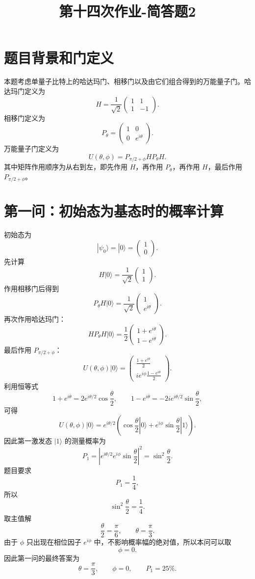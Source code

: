 \documentclass[UTF8]{ctexart}
\title{\textbf{第十四次作业-简答题2}}
\author{}
\date{}
\begin{document}
\maketitle

\section{题目背景和门定义}

本题考虑单量子比特上的哈达玛门、相移门以及由它们组合得到的万能量子门。哈达玛门定义为
\[
H=\frac{1}{\sqrt{2}}
\begin{pmatrix}
1 & 1\\
1 & -1
\end{pmatrix}.
\]
相移门定义为
\[
P_\theta =
\begin{pmatrix}
1 & 0\\
0 & e^{i\theta}
\end{pmatrix}.
\]
万能量子门定义为
\[
U(\theta,\phi)=P_{\pi/2+\phi}HP_\theta H.
\]
其中矩阵作用顺序为从右到左，即先作用 $H$，再作用 $P_\theta$，再作用 $H$，最后作用 $P_{\pi/2+\phi}$。

\section{第一问：初始态为基态时的概率计算}

初始态为
\[
|\psi_0\rangle=|0\rangle=
\begin{pmatrix}
1\\
0
\end{pmatrix}.
\]
先计算
\[
H|0\rangle
=\frac{1}{\sqrt{2}}
\begin{pmatrix}
1\\
1
\end{pmatrix}.
\]
作用相移门后得到
\[
P_\theta H|0\rangle
=\frac{1}{\sqrt{2}}
\begin{pmatrix}
1\\
e^{i\theta}
\end{pmatrix}.
\]
再次作用哈达玛门：
\[
HP_\theta H|0\rangle
=\frac{1}{2}
\begin{pmatrix}
1+e^{i\theta}\\
1-e^{i\theta}
\end{pmatrix}.
\]
最后作用 $P_{\pi/2+\phi}$：
\[
U(\theta,\phi)|0\rangle
=
\begin{pmatrix}
\frac{1+e^{i\theta}}{2}\\
i e^{i\phi}\frac{1-e^{i\theta}}{2}
\end{pmatrix}.
\]
利用恒等式
\[
1+e^{i\theta}=2e^{i\theta/2}\cos\frac{\theta}{2},
\qquad
1-e^{i\theta}=-2ie^{i\theta/2}\sin\frac{\theta}{2},
\]
可得
\[
U(\theta,\phi)|0\rangle
=e^{i\theta/2}
\left(
\cos\frac{\theta}{2}|0\rangle
+e^{i\phi}\sin\frac{\theta}{2}|1\rangle
\right).
\]
因此第一激发态 $|1\rangle$ 的测量概率为
\[
P_1=\left|e^{i\theta/2}e^{i\phi}\sin\frac{\theta}{2}\right|^2
=\sin^2\frac{\theta}{2}.
\]
题目要求
\[
P_1=\frac{1}{4},
\]
所以
\[
\sin^2\frac{\theta}{2}=\frac{1}{4}.
\]
取主值解
\[
\frac{\theta}{2}=\frac{\pi}{6},
\qquad
\theta=\frac{\pi}{3}.
\]
由于 $\phi$ 只出现在相位因子 $e^{i\phi}$ 中，不影响概率幅的绝对值，所以本问可以取
\[
\phi=0.
\]
因此第一问的最终答案为
\[
\boxed{\theta=\frac{\pi}{3},\qquad \phi=0,\qquad P_1=25\%.}
\]
\end{document}
